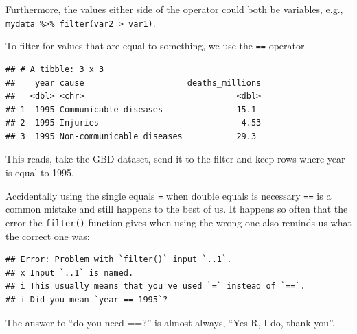 \documentclass[
  12pt,
  krantz2]{krantz}
\makeatletter
\newenvironment{Shaded}{\begin{snugshade}}{\end{snugshade}}
\newcommand{\DataTypeTok}[1]{\textcolor[rgb]{0.13,0.29,0.53}{#1}}
\newcommand{\DecValTok}[1]{\textcolor[rgb]{0.00,0.00,0.81}{#1}}
\newcommand{\KeywordTok}[1]{\textcolor[rgb]{0.13,0.29,0.53}{\textbf{#1}}}
\newcommand{\NormalTok}[1]{#1}
\newcommand{\OperatorTok}[1]{\textcolor[rgb]{0.81,0.36,0.00}{\textbf{#1}}}
\newcommand{\StringTok}[1]{\textcolor[rgb]{0.31,0.60,0.02}{#1}}
\renewenvironment{quote}{\begin{VF}}{\end{VF}}
\newenvironment{kframe}{%
\medskip{}
\setlength{\fboxsep}{.8em}
 \def\at@end@of@kframe{}%
 \ifinner\ifhmode%
  \def\at@end@of@kframe{\end{minipage}}%
  \begin{minipage}{\columnwidth}%
 \fi\fi%
 \def\FrameCommand##1{\hskip\@totalleftmargin \hskip-\fboxsep
 \colorbox{shadecolor}{##1}\hskip-\fboxsep
     \hskip-\linewidth \hskip-\@totalleftmargin \hskip\columnwidth}%
 \MakeFramed {\advance\hsize-\width
   \@totalleftmargin\z@ \linewidth\hsize
   \@setminipage}}%
 {\par\unskip\endMakeFramed%
 \at@end@of@kframe}
\renewenvironment{Shaded}{\begin{kframe}}{\end{kframe}}
\makeatother
\begin{document}
Furthermore, the values either side of the operator could both be variables, e.g., \texttt{mydata\ \%\textgreater{}\%\ filter(var2\ \textgreater{}\ var1)}.

To filter for values that are equal to something, we use the \texttt{==} operator.

\begin{Shaded}
\end{Shaded}

\begin{verbatim}
## # A tibble: 3 x 3
##    year cause                     deaths_millions
##   <dbl> <chr>                               <dbl>
## 1  1995 Communicable diseases               15.1 
## 2  1995 Injuries                             4.53
## 3  1995 Non-communicable diseases           29.3
\end{verbatim}

This reads, take the GBD dataset, send it to the filter and keep rows where year is equal to 1995.

Accidentally using the single equals \texttt{=} when double equals is necessary \texttt{==} is a common mistake and still happens to the best of us.
It happens so often that the error the \texttt{filter()} function gives when using the wrong one also reminds us what the correct one was:

\begin{Shaded}
\end{Shaded}

\begin{verbatim}
## Error: Problem with `filter()` input `..1`.
## x Input `..1` is named.
## i This usually means that you've used `=` instead of `==`.
## i Did you mean `year == 1995`?
\end{verbatim}

\begin{quote}
The answer to ``do you need ==?'' is almost always, ``Yes R, I do, thank you''.
\end{quote}
\end{document}
